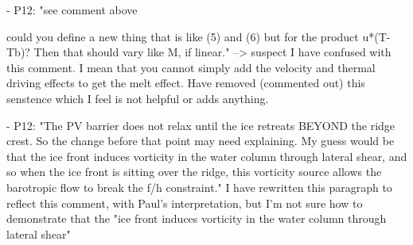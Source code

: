 - P12: "see comment above

could you define a new thing that is like (5) and (6) but for the product u*(T-Tb)?  Then that should vary like M, if linear." --> suspect I have confused with this comment. I mean that you cannot simply add the velocity and thermal driving effects to get the melt effect. Have removed (commented out) this senstence which I feel is not helpful or adds anything.

- P12: "The PV barrier does not relax until the ice retreats BEYOND the ridge crest. So the change before that point may need explaining.  My guess would be that the ice front induces vorticity in the water column through lateral shear, and so when the ice front is sitting over the ridge, this vorticity source allows the barotropic flow to break the f/h constraint."
I have rewritten this paragraph to reflect this comment, with Paul's interpretation, but I'm not sure how to demonstrate that the "ice front induces vorticity in the water column through lateral shear"